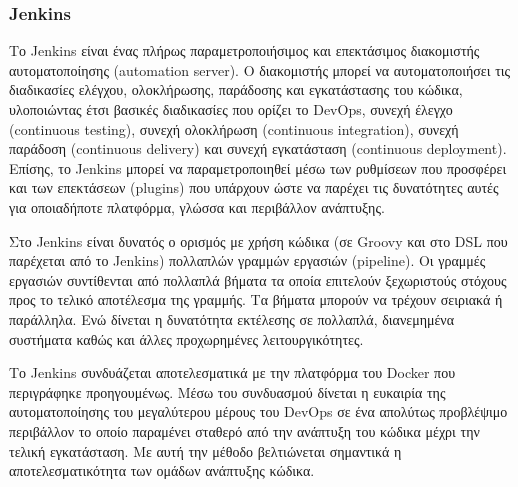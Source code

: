 \subsubsection{Jenkins} \label{subsection:4-2-1-3-jenkins}


Το Jenkins είναι ένας πλήρως παραμετροποιήσιμος και επεκτάσιμος διακομιστής αυτοματοποίησης (automation server). Ο διακομιστής μπορεί να αυτοματοποιήσει τις διαδικασίες ελέγχου, ολοκλήρωσης, παράδοσης και εγκατάστασης του κώδικα, υλοποιώντας έτσι βασικές διαδικασίες που ορίζει το DevOps, συνεχή έλεγχο (continuous testing), συνεχή ολοκλήρωση (continuous integration), συνεχή παράδοση (continuous delivery) και συνεχή εγκατάσταση (continuous deployment). Επίσης, το Jenkins μπορεί να παραμετροποιηθεί μέσω των ρυθμίσεων που προσφέρει και των επεκτάσεων (plugins) που υπάρχουν ώστε να παρέχει τις δυνατότητες αυτές για οποιαδήποτε πλατφόρμα, γλώσσα και περιβάλλον ανάπτυξης.

Στο Jenkins είναι δυνατός ο ορισμός με χρήση κώδικα (σε Groovy και στο DSL που παρέχεται από το Jenkins) πολλαπλών γραμμών εργασιών (pipeline). Οι γραμμές εργασιών συντίθενται από πολλαπλά βήματα τα οποία επιτελούν ξεχωριστούς στόχους προς το τελικό αποτέλεσμα της γραμμής. Τα βήματα μπορούν να τρέχουν σειριακά ή παράλληλα. Ενώ δίνεται η δυνατότητα εκτέλεσης σε πολλαπλά, διανεμημένα συστήματα καθώς και άλλες προχωρημένες λειτουργικότητες.

Το Jenkins συνδυάζεται αποτελεσματικά με την πλατφόρμα του Docker που περιγράφηκε προηγουμένως. Μέσω του συνδυασμού δίνεται η ευκαιρία της αυτοματοποίησης του μεγαλύτερου μέρους του DevOps σε ένα απολύτως προβλέψιμο περιβάλλον το οποίο παραμένει σταθερό από την ανάπτυξη του κώδικα μέχρι την τελική εγκατάσταση. Με αυτή την μέθοδο βελτιώνεται σημαντικά η αποτελεσματικότητα των ομάδων ανάπτυξης κώδικα.

